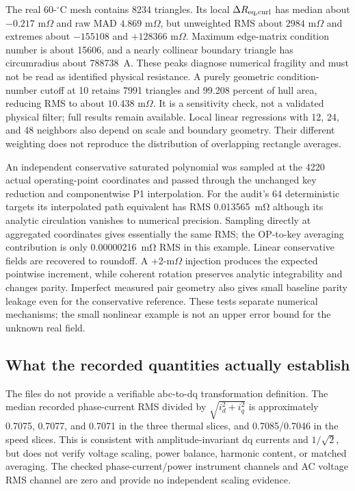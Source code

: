 The real 60-$^\circ$C mesh contains 8234 triangles. Its local
$\Delta R_{\rm eq,curl}$ has median about $-0.217$ m$\Omega$ and raw MAD
$4.869$ m$\Omega$, but unweighted RMS about $2984$ m$\Omega$ and extremes
about $-155108$ and $+128366$ m$\Omega$. Maximum edge-matrix condition number
is about 15606, and a nearly collinear boundary triangle has circumradius
about \SI{788738}{\ampere}. These peaks diagnose numerical fragility and
must not be read as identified physical resistance. A purely geometric
condition-number cutoff at 10 retains 7991 triangles and 99.208 percent
of hull area, reducing RMS to about $10.438$ m$\Omega$. It is a sensitivity
check, not a validated physical filter; full results remain available.
Local linear regressions with 12, 24, and 48 neighbors also depend on scale
and boundary geometry. Their different weighting does not reproduce the
distribution of overlapping rectangle averages.

An independent conservative saturated polynomial was sampled at the 4220
actual operating-point coordinates and passed through the unchanged key
reduction and componentwise P1 interpolation. For the audit's 64 deterministic
targets its interpolated path equivalent has RMS
\SI{0.013565}{\milli\ohm} although its analytic circulation vanishes to
numerical precision. Sampling directly at aggregated coordinates gives
essentially the same RMS; the OP-to-key averaging contribution is only
\SI{0.00000216}{\milli\ohm} RMS in this example. Linear conservative fields
are recovered to roundoff. A +2-m$\Omega$ injection produces the expected
pointwise increment, while coherent rotation preserves analytic integrability
and changes parity. Imperfect measured pair geometry also gives small
baseline parity leakage even for the conservative reference. These tests
separate numerical mechanisms; the small nonlinear example is not an upper
error bound for the unknown real field.

\subsection{What the recorded quantities actually establish}
The files do not provide a verifiable abc-to-dq transformation definition.
The median recorded phase-current RMS divided by
$\sqrt{i_d^2+i_q^2}$ is approximately 0.7075, 0.7077, and 0.7071 in the
three thermal slices, and 0.7085/0.7046 in the speed slices. This is consistent
with amplitude-invariant dq currents and $1/\sqrt2$, but does not verify
voltage scaling, power balance, harmonic content, or matched averaging.
The checked phase-current/power instrument channels and AC voltage RMS
channel are zero and provide no independent scaling evidence.


